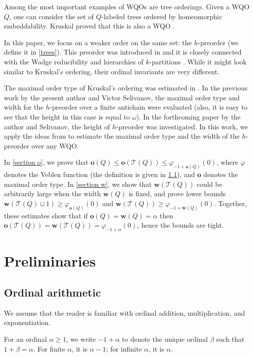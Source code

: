 \documentclass[10pt,a4paper]{amsart}
\let \leq \leqslant
\let \geq \geqslant
\let \phi \varphi
\def \T {\mathcal{T}}
\def \o {\textbf{o}}
\def \w {\textbf{w}}
\begin{document}
Among the most important examples of WQOs are tree orderings. Given a WQO $Q$, one can consider the set of $Q$-labeled trees ordered by homeomorphic embeddability. Kruskal proved that this is also a WQO \cite{Kruskal1960}.

In this paper, we focus on a weaker order on the same set: the $h$-preorder (we define it in \cref{trees}). This preorder was introduced in \cite{Selivanov2011} and it is closely connected with the Wadge reducibility and hierarchies of $k$-partitions \cite{Hertling1993,Selivanov2011}. While it might look similar to Kruskal's ordering, their ordinal invariants are very different.

The maximal order type of Kruskal's ordering was estimated in \cite{Schmidt2020}. In the previous work \cite{Selivanov2025} by the present author and Victor Selivanov, the maximal order type and width for the $h$-preorder over a finite antichain were evaluated (also, it is easy to see that the height in this case is equal to $\omega$). In the forthcoming paper by the author and Selivanov, the height of $h$-preorder was investigated. In this work, we apply the ideas from \cite{Selivanov2025,Friedman2023} to estimate the maximal order type and the width of the $h$-preorder over any WQO.

In \cref{section o}, we prove that $\o(Q) \leq \o(\T(Q)) \leq \phi_{-1+\o(Q)}(0)$, where $\phi$ denotes the Veblen function (the definition is given in \cref{arith}), and $\o$ denotes the maximal order type. In \cref{section w}, we show that $\w(\T(Q))$ could be arbitrarily large when the width $\w(Q)$ is fixed, and prove lower bounds $\w(\T(Q) \sqcup 1) \geq \phi_{\o(Q)}(0)$ and $\w(\T(Q)) \geq \phi_{-1+\w(Q)}(0)$. Together, these estimates show that if $\o(Q) = \w(Q) = \alpha$ then $\o(\T(Q)) = \w(\T(Q)) = \phi_{-1+\alpha}(0)$, hence the bounds are tight.

\section{Preliminaries}

\subsection{Ordinal arithmetic}\label{arith}

We assume that the reader is familiar with ordinal addition, multiplication, and exponentiation.

For an ordinal $\alpha \geq 1$, we write $-1+\alpha$ to denote the unique ordinal $\beta$ such that $1+\beta = \alpha$. For finite $\alpha$, it is $\alpha-1$; for infinite $\alpha$, it is $\alpha$.
\end{document}
